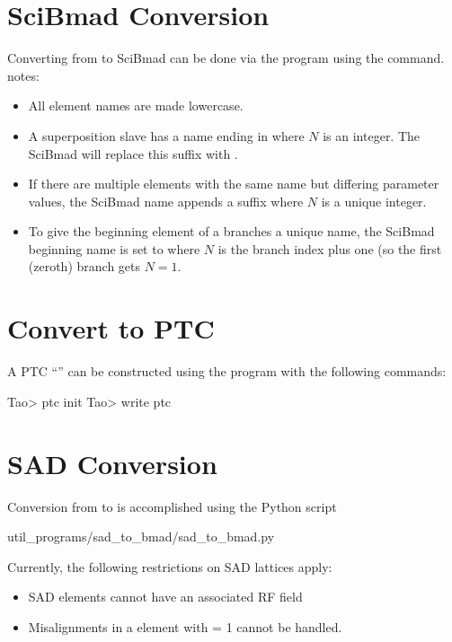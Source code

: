 \section{SciBmad Conversion}
\label{s:to.scibmad}

Converting from \bmad to SciBmad can be done via the \tao program using the  command.
notes:
\begin{itemize}
\item All element names are made lowercase.
%
\item A superposition slave has a \bmad name ending in  where $N$ is an integer. 
The SciBmad will replace this suffix with .
%
\item If there are multiple elements with the same name but differing parameter values, 
the SciBmad name appends a  suffix where $N$ is a unique integer.
%
\item To give the beginning element of a branches a unique name, the SciBmad beginning name is
set to  where $N$ is the branch index plus one (so the first (zeroth) branch
gets $N = 1$.
\end{itemize}

\section{Convert to PTC}
\label{s:to.ptc}

A PTC ``'' can be constructed using the \tao program with the following commands:
\begin{example}
  Tao> ptc init
  Tao> write ptc
\end{example}

\section{SAD Conversion}
\label{s:sad.convert}

Conversion from \cite{b:sad} to \bmad is accomplished using the Python script
\begin{example}
  util_programs/sad_to_bmad/sad_to_bmad.py
\end{example}
Currently, the following restrictions on SAD lattices apply:
  \begin{itemize}
  \item
SAD  elements cannot have an associated RF field
  \item
Misalignments in a  element with  = 1 cannot be handled.
  \end{itemize}

